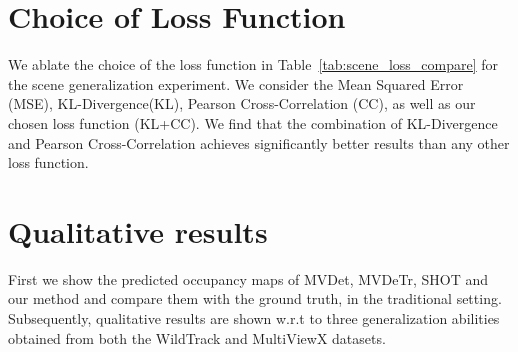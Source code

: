 \documentclass[letterpaper, 10 pt, conference]{ieeeconf}  \usepackage{times}
\newcommand{\wildtrack}{WildTrack }
\newcommand{\multiviewx}{MultiViewX }
\begin{document}
\section{Choice of Loss Function}
\label{sec:choice_loss}

\begin{table}[htbp!]
\begin{center}
\end{center}
\caption{Choice of Loss Function: we present an ablation study for our proposed method on the scene generalization experiment. Overall, the model trained with both KL-Divergence and Cross-Correlation achieves the best performance.}
\label{tab:scene_loss_compare}
\end{table}

We ablate the choice of the loss function in Table~\ref{tab:scene_loss_compare} for the scene generalization experiment. We consider the Mean Squared Error (MSE), KL-Divergence(KL), Pearson Cross-Correlation (CC), as well as our chosen loss function (KL+CC). We find that the combination of KL-Divergence and Pearson Cross-Correlation achieves significantly better results than any other loss function. 

\section{Qualitative results}
\label{sec:qualitative_results}

First we show the predicted occupancy maps of MVDet, MVDeTr, SHOT and our method and compare them with the ground truth, in the traditional setting. Subsequently, qualitative results are shown w.r.t to three generalization abilities obtained from both the \wildtrack and \multiviewx datasets.
\end{document}
